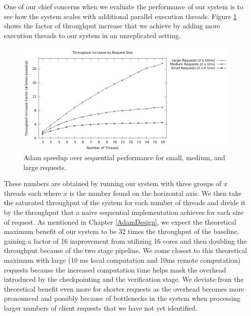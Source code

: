 \documentclass[11pt, oneside]{report}
\begin{document}
One of our chief concerns when we evaluate the performance of our system is to see how the system scales with additional parallel execution threads. Figure \ref{scaling} shows the factor of throughput increase that we achieve by adding more execution threads to our system in an unreplicated setting.

\begin{figure}[h]
\centering
\includegraphics[width=1.0\textwidth]{graphs/requestweights/graph.png}
\caption{\label{scaling}Adam speedup over sequential performance for small, medium, and large requests.}
\end{figure}

These numbers are obtained by running our system with three groups of $x$ threads each where $x$ is the number found on the horizontal axis. 
We then take the saturated throughput of the system for each number of threads and divide it by the throughput that a naive sequential implementation achieves for each size of request.
As mentioned in Chapter \ref{AdamDesign}, we expect the theoretical maximum benefit of our system to be 32 times the throughput of the baseline, gaining a factor of 16 improvement from utilizing 16 cores and then doubling the throughput because of the two stage pipeline.
We come closest to this theoretical maximum with large (10 ms local computation and 10ms remote computation) requests because the increased computation time helps mask the overhead introduced by the checkpointing and the verification stage.
We deviate from the theoretical benefit even more for shorter requests as the overhead becomes more pronounced and possibly because of bottlenecks in the system when processing larger numbers of client requests that we have not yet identified.
\end{document}
